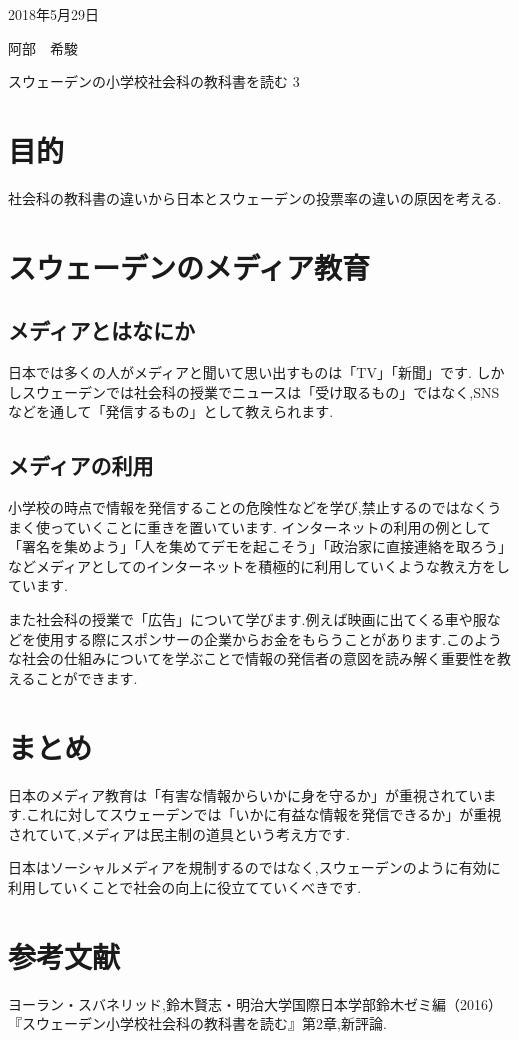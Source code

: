 \documentclass[a4j,10pt]{jsarticle}
\begin{document}
\begin{flushright} %
2018年5月29日

阿部　希駿
\end{flushright}

\begin{center}
\Large{スウェーデンの小学校社会科の教科書を読む 3}
\end{center}

\section{目的}
\label{sec:kihon}
社会科の教科書の違いから日本とスウェーデンの投票率の違いの原因を考える.

\section{スウェーデンのメディア教育}
\subsection{メディアとはなにか}
日本では多くの人がメディアと聞いて思い出すものは「TV」「新聞」です.
しかしスウェーデンでは社会科の授業でニュースは「受け取るもの」ではなく,SNSなどを通して「発信するもの」として教えられます.

\subsection{メディアの利用}
小学校の時点で情報を発信することの危険性などを学び,禁止するのではなくうまく使っていくことに重きを置いています.
インターネットの利用の例として「署名を集めよう」「人を集めてデモを起こそう」「政治家に直接連絡を取ろう」などメディアとしてのインターネットを積極的に利用していくような教え方をしています.

また社会科の授業で「広告」について学びます.例えば映画に出てくる車や服などを使用する際にスポンサーの企業からお金をもらうことがあります.このような社会の仕組みについてを学ぶことで情報の発信者の意図を読み解く重要性を教えることができます.

\section{まとめ}
\label{sec:kihon}
日本のメディア教育は「有害な情報からいかに身を守るか」が重視されています.これに対してスウェーデンでは「いかに有益な情報を発信できるか」が重視されていて,メディアは民主制の道具という考え方です.

日本はソーシャルメディアを規制するのではなく,スウェーデンのように有効に利用していくことで社会の向上に役立てていくべきです.

\section{参考文献}
\label{sec:kihon}
ヨーラン・スバネリッド,鈴木賢志・明治大学国際日本学部鈴木ゼミ編（2016）『スウェーデン小学校社会科の教科書を読む』第2章,新評論.
  
\end{document}
